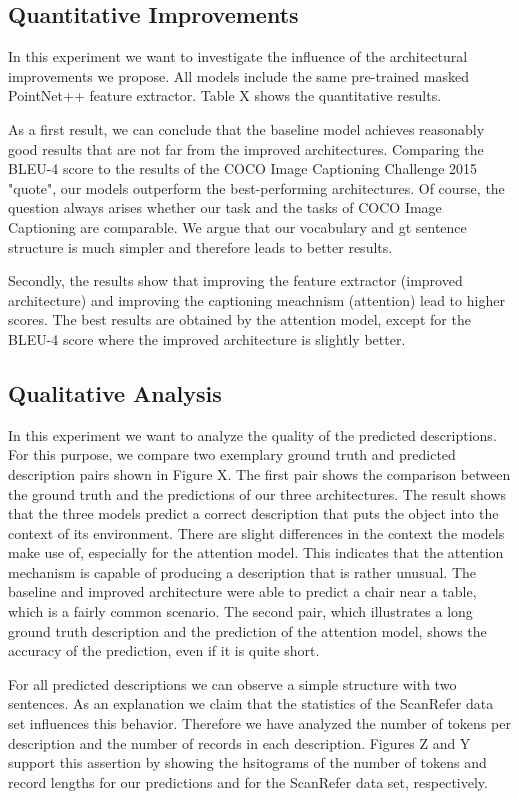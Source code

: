 \documentclass[10pt,twocolumn,letterpaper]{article}
\begin{document}
\subsection{Quantitative Improvements}
In this experiment we want to investigate the influence of the architectural improvements we propose. All models include the same pre-trained masked PointNet++ feature extractor. 
Table X shows the quantitative results. 

As a first result, we can conclude that the baseline model achieves reasonably good results that are not far from the improved architectures. Comparing the BLEU-4 score to the results of the COCO Image Captioning Challenge 2015 "quote", our models outperform the best-performing architectures. Of course, the question always arises whether our task and the tasks of COCO Image Captioning are comparable. We argue that our vocabulary and gt sentence structure is much simpler and therefore leads to better results.

Secondly, the results show that improving the feature extractor (improved architecture) and improving the captioning meachnism (attention) lead to higher scores. The best results are obtained by the attention model, except for the BLEU-4 score where the improved architecture is slightly better.                

\subsection{Qualitative Analysis}
In this experiment we want to analyze the quality of the predicted descriptions. For this purpose, we compare two exemplary ground truth and predicted description pairs shown in Figure X. 
The first pair shows the comparison between the ground truth and the predictions of our three architectures. The result shows that the three models predict a correct description that puts the object into the context of its environment. There are slight differences in the context the models make use of, especially for the attention model. This indicates that the attention mechanism is capable of producing a description that is rather unusual. The baseline and improved architecture were able to predict a chair near a table, which is a fairly common scenario. 
The second pair, which illustrates a long ground truth description and the prediction of the attention model, shows the accuracy of the prediction, even if it is quite short. 

For all predicted descriptions we can observe a simple structure with two sentences. As an explanation we claim that the statistics of the ScanRefer data set influences this behavior. Therefore we have analyzed the number of tokens per description and the number of records in each description. Figures Z and Y support this assertion by showing the hsitograms of the number of tokens and record lengths for our predictions and for the ScanRefer data set, respectively.
\end{document}
